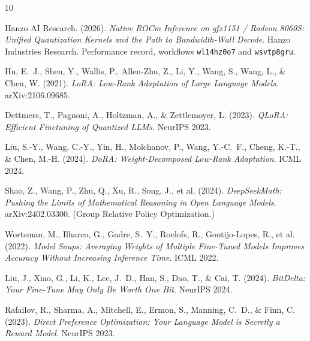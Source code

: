 \documentclass[11pt]{article}
\begin{document}
\begin{thebibliography}{10}

Hanzo AI Research. (2026).
\textit{Native ROCm Inference on gfx1151 / Radeon 8060S: Unified Quantization Kernels and the Path to Bandwidth-Wall Decode}.
Hanzo Industries Research. Performance record, workflows \texttt{wl14hz0o7} and \texttt{wsvtp8gru}.

Hu, E.~J., Shen, Y., Wallis, P., Allen-Zhu, Z., Li, Y., Wang, S., Wang, L., \& Chen, W. (2021).
\textit{LoRA: Low-Rank Adaptation of Large Language Models}.
arXiv:2106.09685.

Dettmers, T., Pagnoni, A., Holtzman, A., \& Zettlemoyer, L. (2023).
\textit{QLoRA: Efficient Finetuning of Quantized LLMs}.
NeurIPS 2023.

Liu, S.-Y., Wang, C.-Y., Yin, H., Molchanov, P., Wang, Y.-C.~F., Cheng, K.-T., \& Chen, M.-H. (2024).
\textit{DoRA: Weight-Decomposed Low-Rank Adaptation}.
ICML 2024.

Shao, Z., Wang, P., Zhu, Q., Xu, R., Song, J., et al. (2024).
\textit{DeepSeekMath: Pushing the Limits of Mathematical Reasoning in Open Language Models}.
arXiv:2402.03300. (Group Relative Policy Optimization.)

Wortsman, M., Ilharco, G., Gadre, S.~Y., Roelofs, R., Gontijo-Lopes, R., et al. (2022).
\textit{Model Soups: Averaging Weights of Multiple Fine-Tuned Models Improves Accuracy Without Increasing Inference Time}.
ICML 2022.

Liu, J., Xiao, G., Li, K., Lee, J.~D., Han, S., Dao, T., \& Cai, T. (2024).
\textit{BitDelta: Your Fine-Tune May Only Be Worth One Bit}.
NeurIPS 2024.

Rafailov, R., Sharma, A., Mitchell, E., Ermon, S., Manning, C.~D., \& Finn, C. (2023).
\textit{Direct Preference Optimization: Your Language Model is Secretly a Reward Model}.
NeurIPS 2023.

\end{thebibliography}
\end{document}

